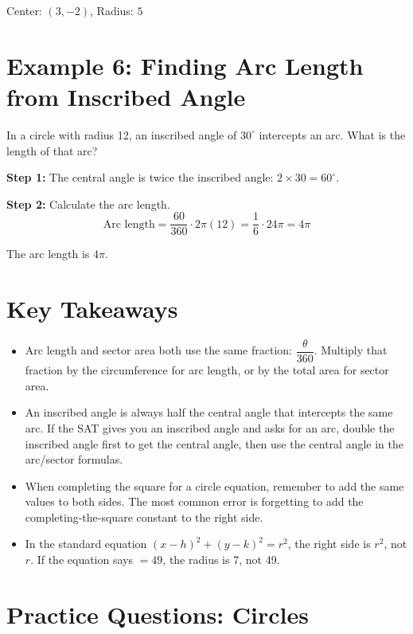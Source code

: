 \documentclass[14pt]{extarticle}
\begin{document}
Center: \(\boxed{(3, -2)}\), Radius: \(\boxed{5}\)

\section*{Example 6: Finding Arc Length from Inscribed Angle}

In a circle with radius 12, an inscribed angle of \(30^\circ\) intercepts an arc. What is the length of that arc?

\textbf{Step 1:} The central angle is twice the inscribed angle: \(2 \times 30 = 60^\circ\).

\textbf{Step 2:} Calculate the arc length.
\[
\text{Arc length} = \frac{60}{360} \cdot 2\pi(12) = \frac{1}{6} \cdot 24\pi = 4\pi
\]

The arc length is \(\boxed{4\pi}\).

\section*{Key Takeaways}
\begin{itemize}
  \item Arc length and sector area both use the same fraction: \(\dfrac{\theta}{360}\). Multiply that fraction by the circumference for arc length, or by the total area for sector area.
  \item An inscribed angle is always half the central angle that intercepts the same arc. If the SAT gives you an inscribed angle and asks for an arc, double the inscribed angle first to get the central angle, then use the central angle in the arc/sector formulas.
  \item When completing the square for a circle equation, remember to add the same values to both sides. The most common error is forgetting to add the completing-the-square constant to the right side.
  \item In the standard equation \((x - h)^2 + (y - k)^2 = r^2\), the right side is \(r^2\), not \(r\). If the equation says \(= 49\), the radius is 7, not 49.
\end{itemize}

\newpage

\section*{Practice Questions: Circles}
\end{document}
